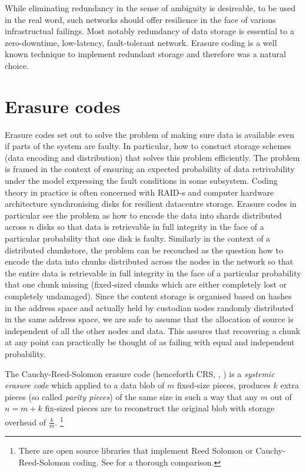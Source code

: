 \documentclass[12pt]{article}
\begin{document}
While eliminating redundancy in the sense of ambiguity is desireable, to be used in the real word, such networks should offer resilience in the face of various infrastructual failings. Most notably redundancy of data storage is essential to a zero-downtime, low-latency, fault-tolerant network. Erasure coding is a well known technique to implement redundant storage and therefore was a natural choice.

\section{Erasure codes}

Erasure codes set out to solve the problem of making sure data is available even if parts of the system are faulty. In particular, how to constuct storage schemes (data encoding and distribution) that solves this problem efficiently.  The problem is framed in the context of ensuring an expected probability of data retrivability under the model expressing the fault conditions in some subsystem.
Coding theory in practice is often concerned with RAID-s and computer hardware architecture synchronising disks for resilient datacentre storage.
Erasure codes in particular see the problem as how to encode the data into shards distributed across $n$ disks so that data is retrievable in full integrity in the face of a particular probability that one disk is faulty.
Similarly in the context of a distributed chunkstore, the problem can be recouched as  the question how to encode the data into chunks distributed across the nodes in the network so that the entire data is retrievable in full integrity in the face of a particular probability that one chunk missing (fixed-sized chunks which are either completely lost or completely undamaged). Since the content storage is organised based on hashes in the address space
and actually held by custodian nodes randomly distributed in the same address space, we are safe to assume that the allocation of source is independent of all the other nodes and data. This assures that recovering a chunk at any point can practically be thought of as failing with equal and independent probability.


The Cauchy-Reed-Solomon erasure code (henceforth CRS, \cite{lubyetal1995CRS}, \cite{plank2006optimizing}) is a \emph{systemic erasure code} which applied to a data blob of $m$ fixed-size pieces, produces $k$ extra pieces (so called \emph{parity pieces}) of the same size in such a way that any $m$ out of $n=m+k$ fix-sized pieces are to reconstruct the original blob with storage overhead of $\frac{k}{m}$.%
%
\footnote{%
There are open source libraries that implement Reed Solomon or Cauchy-Reed-Solomon coding. See \cite{plank2009performance} for a thorough comparison.}
\end{document}
